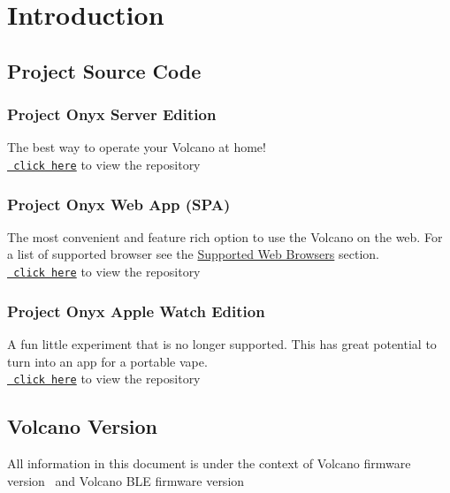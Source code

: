 \newcommand{\repoLink}[1]{

 \href{#1}{\texttt{{\huge\faGithub \normalsize\ click here}}} to view the repository
}
\chapter{Introduction}
\section{Project Source Code}
    \subsection{Project Onyx Server Edition}
    The best way to operate your Volcano at home!\\
    \repoLink{https://github.com/ImACoderImACoderImACoder/ProjectOnyxServerEdition}

    \subsection{Project Onyx Web App (SPA)}
    The most convenient and feature rich option to use the Volcano on the web.
    For a list of supported browser see the
    \hyperref[sec:Supported Web Browsers]{Supported Web Browsers} section.\\  
    \repoLink{https://github.com/ImACoderImACoderImACoder/onyx}

    \subsection{Project Onyx Apple Watch Edition}
    A fun little experiment that is no longer supported.
    This has great potential to turn into an app for a portable vape.\\
    \repoLink{https://github.com/ImACoderImACoderImACoder/ProjectOnyxAppleWatchFiles}
\section{Volcano Version}
All information in this document is under the context of Volcano firmware version \volcanoFirmwareVersion\ and Volcano BLE firmware version \volcanoBleFirmwareVersion\